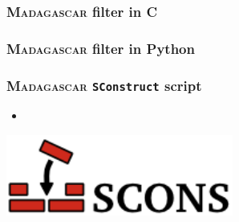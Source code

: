 \begin{frame}
\frametitle{\textsc{Madagascar} filter in C}
\MadLogo

\begin{code}[c]
\centering
\hfill
\begin{minipage}{0.9\textwidth}
\lstset{language=c,showstringspaces=false}

\end{minipage}
\hfill
\end{code}

\end{frame}

\begin{frame}
\frametitle{\textsc{Madagascar} filter in Python}
\MadLogo

\begin{code}[python]
\centering
\hfill
\begin{minipage}{0.9\textwidth}

\end{minipage}
\hfill
\end{code}

\end{frame}

\begin{frame}
\frametitle{\textsc{Madagascar} \texttt{SConstruct} script}
\MadLogo

\begin{code}[python]
\centering
\hfill
\begin{minipage}{0.9\textwidth}

\end{minipage}
\hfill
\end{code}

\vfill

\begin{code}[bash]

\end{code}

\vfill

\begin{minipage}{0.65\textwidth}
\vfill
\begin{itemize}
\item  {}
\end{itemize}
\end{minipage}
\begin{minipage}{0.25\textwidth}
\begin{center}
\includegraphics[height=0.1\textheight]{Fig/SCons}
\end{center}
\end{minipage}

\end{frame}

